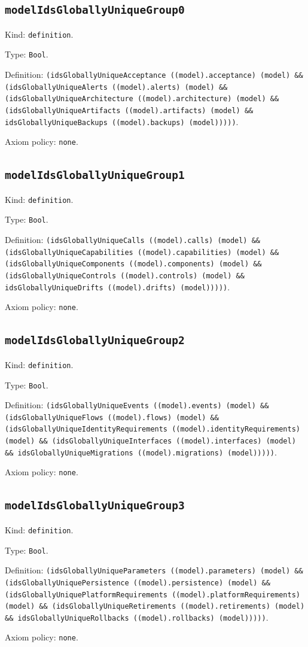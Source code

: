 \documentclass[11pt]{article}
\begin{document}
\subsection*{\texttt{modelIdsGloballyUniqueGroup0}}
\noindent Kind: \texttt{definition}.\par
\noindent Type: \texttt{Bool}.\par
\noindent Definition: \texttt{(idsGloballyUniqueAcceptance ((model).acceptance) (model) \&\& (idsGloballyUniqueAlerts ((model).alerts) (model) \&\& (idsGloballyUniqueArchitecture ((model).architecture) (model) \&\& (idsGloballyUniqueArtifacts ((model).artifacts) (model) \&\& idsGloballyUniqueBackups ((model).backups) (model)))))}.\par
\noindent Axiom policy: \texttt{none}.\par
\subsection*{\texttt{modelIdsGloballyUniqueGroup1}}
\noindent Kind: \texttt{definition}.\par
\noindent Type: \texttt{Bool}.\par
\noindent Definition: \texttt{(idsGloballyUniqueCalls ((model).calls) (model) \&\& (idsGloballyUniqueCapabilities ((model).capabilities) (model) \&\& (idsGloballyUniqueComponents ((model).components) (model) \&\& (idsGloballyUniqueControls ((model).controls) (model) \&\& idsGloballyUniqueDrifts ((model).drifts) (model)))))}.\par
\noindent Axiom policy: \texttt{none}.\par
\subsection*{\texttt{modelIdsGloballyUniqueGroup2}}
\noindent Kind: \texttt{definition}.\par
\noindent Type: \texttt{Bool}.\par
\noindent Definition: \texttt{(idsGloballyUniqueEvents ((model).events) (model) \&\& (idsGloballyUniqueFlows ((model).flows) (model) \&\& (idsGloballyUniqueIdentityRequirements ((model).identityRequirements) (model) \&\& (idsGloballyUniqueInterfaces ((model).interfaces) (model) \&\& idsGloballyUniqueMigrations ((model).migrations) (model)))))}.\par
\noindent Axiom policy: \texttt{none}.\par
\subsection*{\texttt{modelIdsGloballyUniqueGroup3}}
\noindent Kind: \texttt{definition}.\par
\noindent Type: \texttt{Bool}.\par
\noindent Definition: \texttt{(idsGloballyUniqueParameters ((model).parameters) (model) \&\& (idsGloballyUniquePersistence ((model).persistence) (model) \&\& (idsGloballyUniquePlatformRequirements ((model).platformRequirements) (model) \&\& (idsGloballyUniqueRetirements ((model).retirements) (model) \&\& idsGloballyUniqueRollbacks ((model).rollbacks) (model)))))}.\par
\noindent Axiom policy: \texttt{none}.\par
\end{document}
